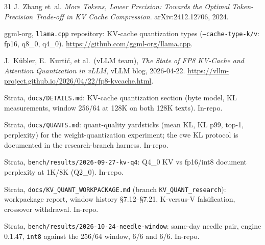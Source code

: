\documentclass[10pt,twocolumn]{article}
\begin{document}
\begin{thebibliography}{31}
J.~Zhang et~al.
\emph{More Tokens, Lower Precision: Towards the Optimal Token-Precision Trade-off in KV Cache Compression}.
arXiv:2412.12706, 2024.

ggml-org, \texttt{llama.cpp} repository:
KV-cache quantization types (\texttt{--cache-type-k/v}: fp16, q8\_0, q4\_0).
\url{https://github.com/ggml-org/llama.cpp}.

J.~K{\"u}bler, E.~Kurti{\'c}, et al.\ (vLLM team), \emph{The State of FP8 KV-Cache and Attention Quantization in vLLM}, vLLM blog, 2026-04-22.
\url{https://vllm-project.github.io/2026/04/22/fp8-kvcache.html}.

Strata, \texttt{docs/DETAILS.md}: KV-cache quantization section (byte model, KL measurements, window 256/64 at 128K on both 128K texts). In-repo.

Strata, \texttt{docs/QUANTS.md}: quant-quality yardsticks (mean KL, KL p99, top-1, perplexity) for the weight-quantization experiment; the cwe KL protocol is documented in the research-branch harness. In-repo.

Strata, \texttt{bench/results/2026-09-27-kv-q4}: Q4\_0 KV vs fp16/int8 document perplexity at 1K/8K (Q2\_0). In-repo.

Strata, \texttt{docs/KV\_QUANT\_WORKPACKAGE.md} (branch \texttt{KV\_QUANT\_research}): workpackage report, window history \S7.12--\S7.21, K-versus-V falsification, crossover withdrawal. In-repo.

Strata, \texttt{bench/results/2026-10-24-needle-window}: same-day needle pair, engine 0.1.47, \texttt{int8} against the 256/64 window, 6/6 and 6/6. In-repo.

\end{thebibliography}
\end{document}
